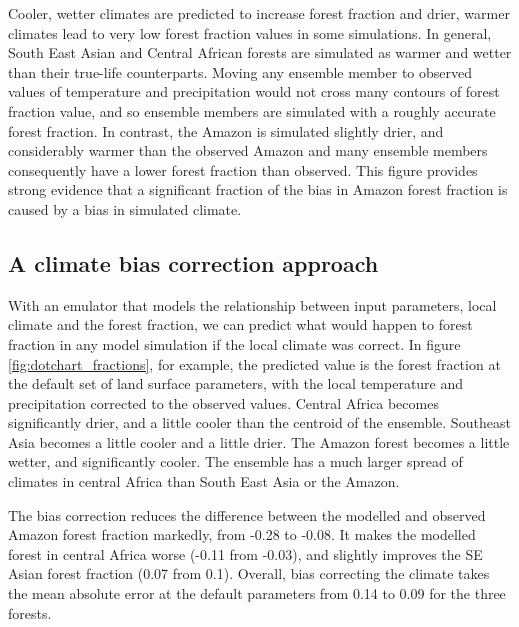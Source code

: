 \documentclass[gmd, manuscript]{copernicus}
\begin{document}
Cooler, wetter climates are predicted to increase forest fraction and drier, warmer climates lead to very low forest fraction values in some simulations. In general, South East Asian and Central African forests are simulated as warmer and wetter than their true-life counterparts. Moving any ensemble member to observed values of temperature and precipitation would not cross many contours of forest fraction value, and so ensemble members are simulated with a roughly accurate forest fraction. In contrast, the Amazon is simulated slightly drier, and considerably warmer than the observed Amazon and many ensemble members consequently have a lower forest fraction than observed. This figure provides strong evidence that a significant fraction of the bias in Amazon forest fraction is caused by a bias in simulated climate.


\subsection{A climate bias correction approach}\label{ssec:bc_approach}
With an emulator that models the relationship between input parameters, local climate and the forest fraction, we can predict what would happen to forest fraction in any model simulation if the local climate was correct. In figure \ref{fig:dotchart_fractions}, for example, the predicted value is the forest fraction at the default set of land surface parameters, with the local temperature and precipitation corrected to the observed values. Central Africa becomes significantly drier, and a little cooler than the centroid of the ensemble. Southeast Asia becomes a little cooler and a little drier. The Amazon forest becomes a little wetter, and significantly cooler. The ensemble has a much larger spread of climates in central Africa than South East Asia or the Amazon.

The bias correction reduces the difference between the modelled and observed Amazon forest fraction markedly, from -0.28 to -0.08. It makes the modelled forest in central Africa worse (-0.11 from -0.03), and slightly improves the SE Asian forest fraction (0.07 from 0.1). Overall, bias correcting the climate takes the mean absolute error at the default parameters from 0.14 to 0.09 for the three forests.
\end{document}
